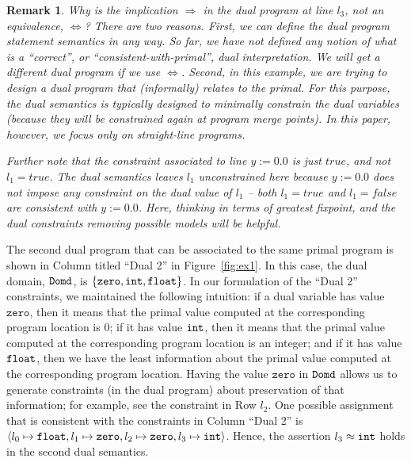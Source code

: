 \documentclass[preprint]{sig-alternate-05-2015}
\newtheorem{remark}{Remark}
\def\zero{{\tt{zero}}}
\def\float{{\tt{float}}}
\def\int{{\tt{int}}}
\def\domd{{\tt{Domd}}}
\def\zero{{\mathtt{zero}}}
\begin{document}
\begin{remark}
  Why is the implication $\Rightarrow$ in the dual program at line 
  $l_3$, not an equivalence, $\Leftrightarrow$?
  There are two reasons. First, we can define the dual program statement
  semantics in any way. So far, we have not defined any notion of what is 
  a ``correct'', or ``consistent-with-primal'', dual interpretation.
  We will get a different dual program if we use $\Leftrightarrow$.
  Second, in this example, we are trying to design a dual program that
  (informally) relates to the primal.
  For this purpose, the dual semantics is typically designed to minimally
  constrain the dual variables (because they will be constrained again
  at program merge points).  In this paper, however, we focus only on
  straight-line programs.

  Further note that the constraint associated to line $y := 0.0$ is 
  just $\mathit{true}$, and {\em{not}} $l_1 = \mathit{true}$. The dual semantics
  leaves $l_1$ unconstrained here because $y := 0.0$ does not impose 
  any constraint on the dual value of $l_1$ -- both $l_1 = \mathit{true}$
  and $l_1 = \mathit{false}$ are consistent with $y := 0.0$.
  Here, thinking in terms of greatest fixpoint, and the dual constraints 
  removing possible models will be helpful.

\end{remark}

The second dual program that can be associated to the same primal program
is shown in Column titled ``Dual 2'' in Figure~\ref{fig:ex1}. 
In this case, the dual domain,
$\domd$, is $\{\zero,\- \int,\- \float\}$.
In our formulation of the ``Dual 2'' constraints,
we maintained the following intuition:
if a dual variable has value $\zero$,
then it means that the primal value computed at the corresponding program location is $0$;
if it has value $\int$,
then it means that the primal value computed at the corresponding program location is
an integer; and
if it has value $\float$,
then we have the least information about the primal value computed at the corresponding program location.
Having the value $\zero$ in $\domd$ allows us to generate constraints (in the dual program) about preservation of
that information; for example, see the constraint in Row $l_2$.
One possible assignment that is consistent with the constraints in Column ``Dual 2''
is $\langle l_0 \mapsto \float, l_1 \mapsto \zero, l_2\mapsto \zero, l_3\mapsto \int\rangle$.
Hence, the assertion $l_3\approx\int$ holds in the second dual semantics.
\end{document}
